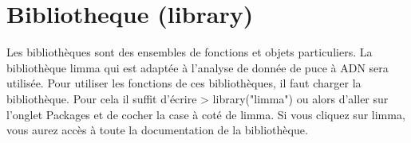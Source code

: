 \section{Bibliotheque (library)}
Les bibliothèques sont des ensembles de fonctions et objets particuliers. La bibliothèque limma qui est adaptée à l'analyse de donnée de puce à ADN sera utilisée.
Pour utiliser les fonctions de ces bibliothèques, il faut charger la bibliothèque. Pour cela il suffit d'écrire
> library("limma")
ou alors d'aller sur l'onglet Packages et de cocher la case à coté de limma. Si vous cliquez sur limma, vous aurez accès à toute la documentation de la bibliothèque.


